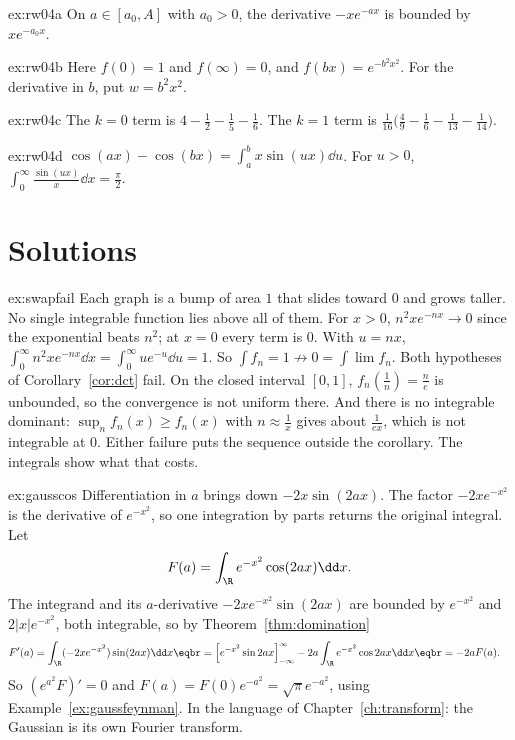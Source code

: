 \begin{hint}{ex:rw04a}
On $a\in[a_0,A]$ with $a_0>0$, the derivative $-xe^{-ax}$ is bounded by $xe^{-a_0x}$.
\end{hint}

\begin{hint}{ex:rw04b}
Here $f(0)=1$ and $f(\infty)=0$, and $f(bx)=e^{-b^2x^2}$. For the derivative in $b$, put $w=b^2x^2$.
\end{hint}

\begin{hint}{ex:rw04c}
The $k=0$ term is $4-\frac12-\frac15-\frac16$. The $k=1$ term is $\frac1{16}\bigl(\frac49-\frac16-\frac1{13}-\frac1{14}\bigr)$.
\end{hint}

\begin{hint}{ex:rw04d}
$\cos(ax)-\cos(bx)=\int_a^b x\sin(ux)\dd u$. For $u>0$, $\int_0^\infty\frac{\sin(ux)}x\dd x=\frac\pi2$.
\end{hint}

\section{Solutions}

\begin{solution}{ex:swapfail}
\idea Each graph is a bump of area $1$ that slides toward $0$ and grows taller. No single integrable function lies above all of them.
\writeup For $x>0$, $n^2xe^{-nx}\to0$ since the exponential beats $n^2$; at $x=0$ every term is $0$. With $u=nx$,
$\int_0^\infty n^2xe^{-nx}\dd x=\int_0^\infty ue^{-u}\dd u=1$. So $\int f_n=1\not\to0=\int\lim f_n$. Both hypotheses of Corollary~\ref{cor:dct} fail. On the closed interval $[0,1]$, $f_n(\frac1n)=\frac ne$ is unbounded, so the convergence is not uniform there. And there is no integrable dominant: $\sup_nf_n(x)\ge f_n(x)$ with $n\approx\frac1x$ gives about $\frac1{ex}$, which
is not integrable at $0$. Either failure puts the sequence outside the corollary. The integrals show what that costs.
\end{solution}

\begin{solution}{ex:gausscos}
\idea Differentiation in $a$ brings down $-2x\sin(2ax)$. The factor $-2xe^{-x^2}$ is the derivative of $e^{-x^2}$, so one integration by parts returns the original integral.
\writeup Let
\[
F(a)=\int_{\R}e^{-x^2}\cos(2ax)\dd x.
\]
The integrand and its $a$-derivative $-2xe^{-x^2}\sin(2ax)$ are bounded by $e^{-x^2}$
and $2|x|e^{-x^2}$, both integrable, so by Theorem~\ref{thm:domination}
\[
\begin{aligned}F'(a)&=\int_{\R}(-2xe^{-x^2})\sin(2ax)\dd x\eqbr=\Bigl[e^{-x^2}\sin2ax\Bigr]_{-\infty}^\infty-2a\int_{\R}e^{-x^2}\cos2ax\dd x\eqbr=-2aF(a).\end{aligned}
\]
So $(e^{a^2}F)'=0$ and $F(a)=F(0)e^{-a^2}=\sqrt\pi e^{-a^2}$, using Example~\ref{ex:gaussfeynman}. In the language of Chapter~\ref{ch:transform}: the
Gaussian is its own Fourier transform.
\end{solution}

